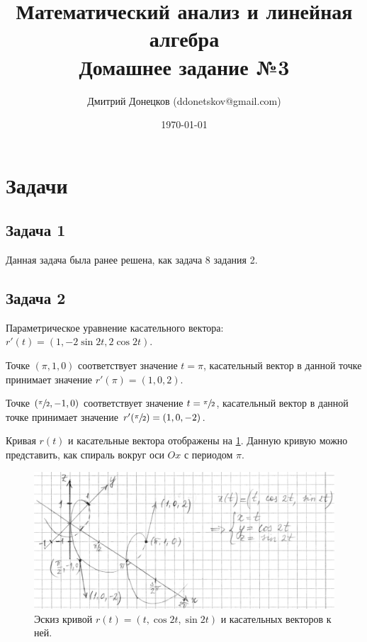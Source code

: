 \documentclass[a4paper,11pt]{article}
\title{\vspace{-1.5cm}Математический анализ и линейная алгебра \\
Домашнее задание №3}
\author{Дмитрий Донецков (ddonetskov@gmail.com)}
\date{\today}
\begin{document}
\maketitle

\section{Задачи}

\subsection{Задача 1}

Данная задача была ранее решена, как задача 8 задания 2.

\subsection{Задача 2}

Параметрическое уравнение касательного вектора: $r'(t) = (1, -2\sin 2t, 2\cos 2t)$.

Точке $(\pi, 1, 0)$ соответствует значение $t = \pi$, касательный вектор в данной точке  принимает значение $r'(\pi) = (1, 0, 2)$. 

Точке $(\sfrac{\pi}{2}, -1, 0)$ соответствует значение $t = \sfrac{\pi}{2}$, касательный вектор в данной точке принимает значение $r'(\sfrac{\pi}{2}) = (1, 0, -2)$.

Кривая $r(t)$ и касательные вектора отображены на \ref{fig:task2}. Данную кривую можно представить, как спираль вокруг оси $Ox$ с периодом $\pi$.

\begin{figure}[h!]
  \centering
    \includegraphics{images/task2.jpg}
  \caption{Эскиз кривой $r(t) = (t, \cos 2t, \sin 2t)$ и касательных векторов к ней.}
  \label{fig:task2}
\end{figure}

\newpage
\end{document}
